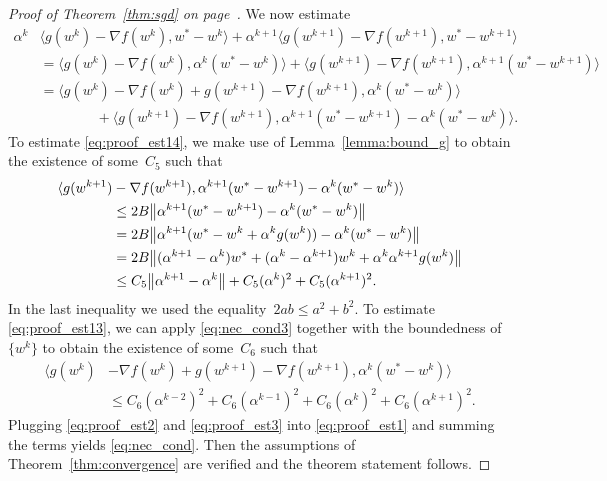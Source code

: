 \begin{proof}[Proof of Theorem~\ref{thm:sgd} on page~\pageref{thm:sgd}]
  We now estimate
  \begin{subequations}\label{eq:proof_est1}
    \begin{align}
      \label{eq:proof_est11} \alpha^k
      & \langle g(w^{k})-\nabla f(w^{k}),w^*-w^{k}\rangle + \alpha^{k+1}\langle g(w^{k+1})-\nabla f(w^{k+1}),w^*-w^{k+1}\rangle \\
      \label{eq:proof_est12}
      & = \langle g(w^{k})-\nabla f(w^{k}),\alpha^k(w^*-w^{k})\rangle + \langle g(w^{k+1})-\nabla f(w^{k+1}),\alpha^{k+1}(w^*-w^{k+1})\rangle \\
      \label{eq:proof_est13}
      & = \langle g(w^{k})-\nabla f(w^{k}) + g(w^{k+1})-\nabla f(w^{k+1}),\alpha^k(w^*-w^{k})\rangle \\
      \label{eq:proof_est14}
      & \qquad \qquad + \langle g(w^{k+1})-\nabla f(w^{k+1}),\alpha^{k+1}(w^*-w^{k+1})-\alpha^k(w^*-w^{k})\rangle.
    \end{align}
  \end{subequations}
  To estimate \eqref{eq:proof_est14}, we make use of Lemma~\ref{lemma:bound_g} to obtain the existence of some~$C_5$ such that
  \begin{equation}\label{eq:proof_est2}
    \begin{aligned}
    \langle g(w^{k+1})
    & -\nabla f(w^{k+1}),\alpha^{k+1}(w^*-w^{k+1})-\alpha^k(w^*-w^{k})\rangle \\
    & \le 2B\norm{\alpha^{k+1}(w^*-w^{k+1})-\alpha^k(w^*-w^{k})} \\
    & = 2B\norm{\alpha^{k+1}(w^*-w^k+\alpha^kg(w^k))-\alpha^k(w^*-w^{k})} \\
    & = 2B\norm{(\alpha^{k+1}-\alpha^k)w^* + (\alpha^k-\alpha^{k+1})w^k +\alpha^k\alpha^{k+1} g(w^k)} \\
    & \le C_5 \nrm{\alpha^{k+1}-\alpha^k} + C_5(\alpha^k)^2 + C_5(\alpha^{k+1})^2.
    \end{aligned}
  \end{equation}
  In the last inequality we used the equality~$2ab\le a^2+b^2$. To estimate \eqref{eq:proof_est13}, we can apply \eqref{eq:nec_cond3} together with the boundedness of~$\{w^k\}$ to obtain the existence of some~$C_6$ such that
  \begin{equation}\label{eq:proof_est3}
    \begin{aligned}
      \langle g(w^{k})&-\nabla f(w^{k}) + g(w^{k+1})-\nabla f(w^{k+1}),\alpha^k(w^*-w^{k})\rangle \\
      & \le C_6(\alpha^{k-2})^2 + C_6(\alpha^{k-1})^2 + C_6(\alpha^{k})^2 + C_6(\alpha^{k+1})^2.
    \end{aligned}
  \end{equation}
  Plugging \eqref{eq:proof_est2} and \eqref{eq:proof_est3} into \eqref{eq:proof_est1} and summing the terms yields \eqref{eq:nec_cond}. Then the assumptions of Theorem~\ref{thm:convergence} are verified and the theorem statement follows.
\end{proof}

